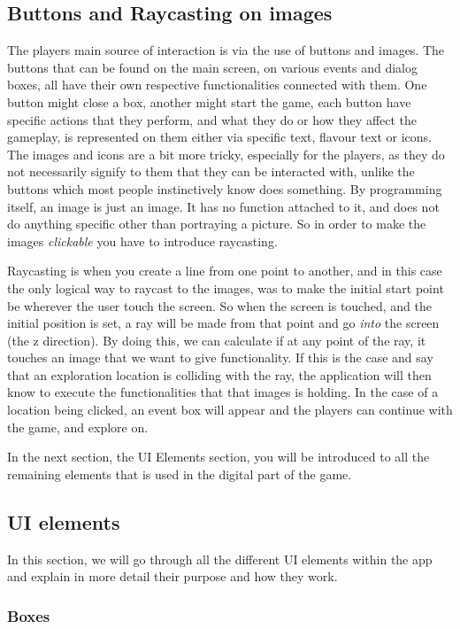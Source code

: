 \subsection{Buttons and Raycasting on images}
The players main source of interaction is via the use of buttons and images. The buttons that can be found on the main screen, on various events and dialog boxes, all have their own respective functionalities connected with them. One button might close a box, another might start the game, each button have specific actions that they perform, and what they do or how they affect the gameplay, is represented on them either via specific text, flavour text or icons.
The images and icons are a bit more tricky, especially for the players, as they do not necessarily signify to them that they can be interacted with, unlike the buttons which most people instinctively know does something.
By programming itself, an image is just an image. It has no function attached to it, and does not do anything specific other than portraying a picture. So in order to make the images \textit{clickable} you have to introduce raycasting.

Raycasting is when you create a line from one point to another, and in this case the only logical way to raycast to the images, was to make the initial start point be wherever the user touch the screen. So when the screen is touched, and the initial position is set, a ray will be made from that point and go \textit{into} the screen (the z direction). By doing this, we can calculate if at any point of the ray, it touches an image that we want to give functionality. If this is the case and say that an exploration location is colliding with the ray, the application will then know to execute the functionalities that that images is holding. In the case of a location being clicked, an event box will appear and the players can continue with the game, and explore on.

In the next section, the UI Elements section, you will be introduced to all the remaining elements that is used in the digital part of the game.

\subsection{UI elements}
In this section, we will go through all the different UI elements within the app and explain in more detail their purpose and how they work.

\subsubsection{Boxes}

